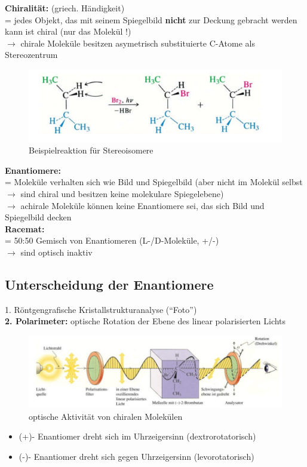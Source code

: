 \textbf{{\large Chiralität:}} (griech. Händigkeit)\\
= jedes Objekt, das mit seinem Spiegelbild \textbf{nicht} zur Deckung gebracht werden kann ist chiral (nur das Molekül !)\\
$\rightarrow$ chirale Moleküle besitzen asymetrisch substituierte C-Atome als Stereozentrum
\begin{figure}[h!]
	\centering
	\includegraphics[width=0.75\linewidth]{img/chiral1}
	\caption{Beispielreaktion für Stereoisomere}
	\label{fig:ciral1}
\end{figure}
\FloatBarrier

\textbf{{\large Enantiomere:}} \\
= Moleküle verhalten sich wie Bild und Spiegelbild \linebreak 
 (aber nicht im Molekül selbst $\rightarrow$ sind chiral und besitzen keine molekulare Spiegelebene) \\
 $\rightarrow$ achirale Moleküle können keine Enantiomere sei, das sich Bild und Spiegelbild decken\\
 
\textbf{{\large Racemat:}} \\
= 50:50 Gemisch von Enantiomeren (L-/D-Moleküle, +/-)\\
$\rightarrow$ sind optisch inaktiv

\subsection{Unterscheidung der Enantiomere}
1. Röntgengrafische Kristallstrukturanalyse ("`Foto"')\\ 
\textbf{2. Polarimeter:} optische Rotation der Ebene des linear polarisierten Lichts


\begin{figure}[h!]
	\centering
	\includegraphics[width=0.75\linewidth]{img/polarimeter}
	\caption{optische Aktivität von chiralen Molekülen}
	\label{fig:polarimeter}
\end{figure}
\FloatBarrier
\begin{itemize}
	\item (+)- Enantiomer dreht sich im Uhrzeigersinn (dextrorotatorisch)
	\item (-)- Enantiomer dreht sich gegen Uhrzeigersinn (levorotatorisch)
\end{itemize}

